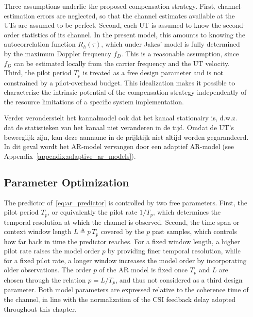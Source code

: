 Three assumptions underlie the proposed compensation strategy.
First, channel-estimation errors are neglected, so that the channel estimates available at the \acp{UT} are assumed to be perfect.
Second, each \ac{UT} is assumed to know the second-order statistics of its channel. In the present model, this amounts to knowing the autocorrelation function $R_h(\tau)$, which under Jakes' model is fully determined by the maximum Doppler frequency $f_D$. This is a reasonable assumption, since $f_D$ can be estimated locally from the carrier frequency and the \ac{UT} velocity.
Third, the pilot period $T_p$ is treated as a free design parameter and is not constrained by a pilot-overhead budget. This idealization makes it possible to characterize the intrinsic potential of the compensation strategy independently of the resource limitations of a specific system implementation.

Verder veronderstelt het kannalmodel ook dat het kanaal stationairy is, d.w.z. dat de statistieken van het kanaal niet veranderen in de tijd. Omdat de UT's beweeglijk zijn, kan deze aanname in de prijktijk niet altijd worden gegarandeerd. In dit geval wordt het AR-model vervangen door een adaptief AR-model (see Appendix~\ref{appendix:adaptive_ar_models}).

\subsection{Parameter Optimization}
\label{subsection:compensation_parameter_optimization}

The predictor of~\eqref{eq:ar_predictor} is controlled by two free parameters. 
First, the pilot period $T_p$, or equivalently the pilot rate $1/T_p$, which determines the temporal resolution at which the channel is observed.
Second, the time span or context window length $L \triangleq p\, T_p$ covered by the $p$ past samples, which controls how far back in time the predictor reaches.
For a fixed window length, a higher pilot rate raises the model order $p$ by providing finer temporal resolution, while for a fixed pilot rate, a longer window increases the model
order by incorporating older observations.
The order $p$ of the \ac{AR} model is fixed once $T_p$ and $L$ are chosen through the relation $p = L/T_p$, and thus not considered as a third design parameter.
Both model parameters are expressed relative to the coherence time of the channel, in line with the normalization of the \ac{CSI} feedback delay adopted throughout this chapter.

